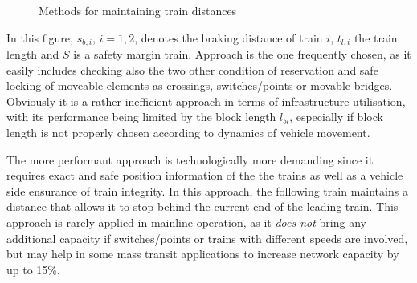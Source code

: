 \documentclass[a4paper, 12pt]{scrartcl}
\begin{document}
\begin{figure}
\begin{center}
\label{fig:AbsBakDist}
\end{center}
\begin{center}
\label{fig:AbsSpacDist}
\end{center}
\caption{Methods for maintaining train distances}
\label{fig:DistanceKeeping}
\end{figure}

In this figure, $s_{b,i}$, $i = 1,2$, denotes the braking distance of train $i$, $t_{l, i}$ the train length and $S$ is a safety margin train. Approach  is the one frequently chosen, as it easily includes checking also the two other condition of reservation and safe locking of moveable elements as crossings, switches/points or movable bridges.
Obviously it is a rather inefficient approach in terms of infrastructure utilisation, with its performance being limited by the block length $l_{bl}$, especially if block length is not properly chosen according to dynamics of vehicle movement. 

The more performant approach  is technologically more demanding since it requires exact and safe position information of the the trains as well as a vehicle side ensurance of train integrity. In this approach, the following train maintains a distance that allows it to stop behind the current end of the leading train. This approach is rarely applied in mainline operation, as it \emph{does not} bring any additional capacity if switches/points or trains with different speeds are involved, but may help in some mass transit applications to increase network capacity \cite{pachl2011systemtechnik} by up to 15\%. 
\end{document}
